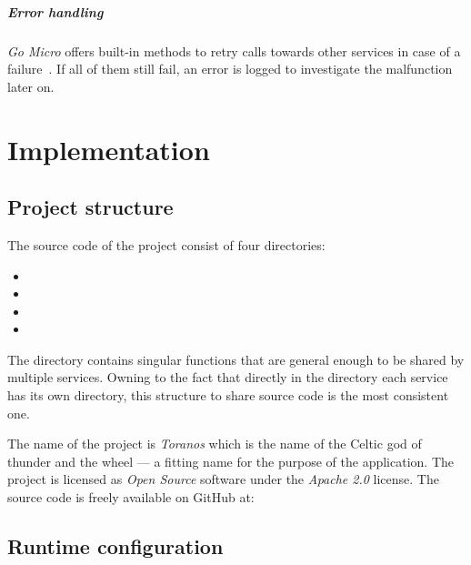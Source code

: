 \documentclass[12pt,a4paper,twoside]{report}
\begin{document}
\paragraph{Error handling}
\textit{Go Micro} offers built-in methods to retry calls towards
other services in case of a failure~\cite{go-micro}. If all of them still fail,
an error is logged to investigate the malfunction later on.



\chapter{Implementation} \label{chap:implementation}



\section{Project structure}

The source code of the project consist of four directories:
\begin{itemize}[noitemsep]
\item {}
\item {}
\item {}
\item {}
\end{itemize}
The  directory contains singular functions that are general
enough to be shared by multiple services. Owning to the fact that directly in the
 directory each service has its own directory, this structure
to share source code is the most consistent one.

The name of the project is \textit{Toranos} which is the name of the
Celtic god of thunder and the wheel --- a fitting name for the purpose of the application.
The project is licensed as \textit{Open Source} software under the
\textit{Apache 2.0} license. The source code is freely available on GitHub at:\\


\section{Runtime configuration}
\end{document}
